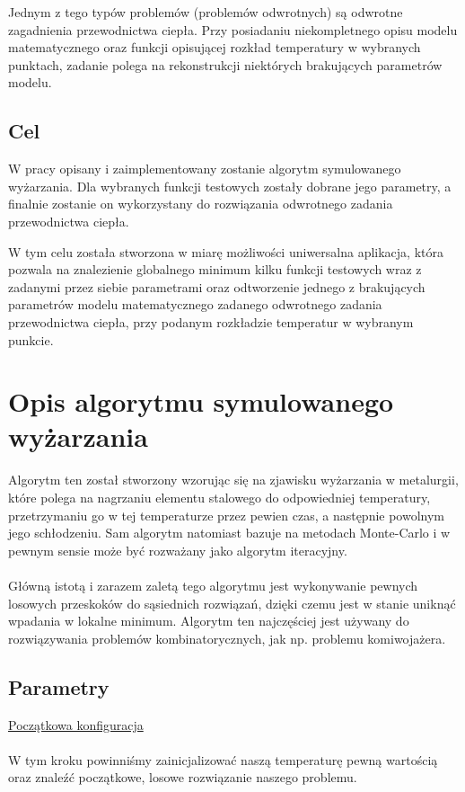 \documentclass[twoside]{projektInzynierskiMS1}
\newcommand{\newLine}{~\\}
\newcommand{\si}{ś}
\begin{document}
Jednym z tego typów problemów (problemów odwrotnych) są odwrotne zagadnienia przewodnictwa ciepła. Przy posiadaniu niekompletnego opisu modelu matematycznego oraz funkcji opisującej rozkład temperatury w wybranych punktach, zadanie polega na rekonstrukcji niektórych brakujących parametrów modelu. 

\subsection{Cel}

W pracy opisany i zaimplementowany zostanie algorytm symulowanego wyżarzania. Dla wybranych funkcji testowych zostały dobrane jego parametry, a finalnie zostanie on wykorzystany do rozwiązania odwrotnego zadania przewodnictwa ciepła.

W tym celu została stworzona w miarę możliwo\si ci uniwersalna aplikacja, która pozwala na znalezienie globalnego minimum kilku funkcji testowych wraz z zadanymi przez siebie parametrami oraz odtworzenie jednego z brakujących parametrów modelu matematycznego zadanego odwrotnego zadania przewodnictwa ciepła, przy podanym rozkładzie temperatur w wybranym punkcie.


\section{Opis algorytmu symulowanego wyżarzania}
				Algorytm ten został stworzony wzorując się na zjawisku wyżarzania w metalurgii, które polega na nagrzaniu elementu stalowego do odpowiedniej temperatury, przetrzymaniu go w tej temperaturze przez pewien czas, a następnie powolnym jego schłodzeniu. Sam algorytm natomiast bazuje na metodach Monte-Carlo i w pewnym sensie może być rozważany jako algorytm iteracyjny.\\ \newLine
Główną istotą i zarazem zaletą tego algorytmu jest wykonywanie pewnych losowych przeskoków do sąsiednich rozwiązań, dzięki czemu jest w stanie uniknąć wpadania w lokalne minimum. Algorytm ten najczę\si ciej jest używany do rozwiązywania problemów kombinatorycznych, jak np. problemu komiwojażera. \\


		\subsection{Parametry}
		
\noindent \underline{Początkowa konfiguracja} \\ \newLine
\indent W tym kroku powinniśmy zainicjalizować naszą temperaturę pewną wartością oraz znaleźć początkowe, losowe rozwiązanie naszego problemu. 
\\ \newLine
\end{document}
